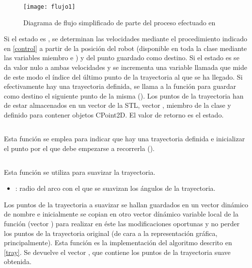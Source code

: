 \begin{figure}[h]
  \centering\texttt{[image: flujo1]}\\
  \caption{Diagrama de flujo simplificado de parte del proceso efectuado en }\label{fg:flujo1}
\end{figure}
Si el estado es , se determinan las velocidades mediante el procedimiento indicado en \ref{control} a partir de la posición del robot (disponible en toda la clase mediante las variables miembro  e ) y del punto guardado como destino.
Si el estado es  se da valor nulo a ambas velocidades y se incrementa una variable llamada  que mide de este modo el índice del último punto de la trayectoria al que se ha llegado. Si efectivamente hay una trayectoria definida, se llama a la función  para guardar como destino el siguiente punto de la misma (). Los puntos de la trayectoria han de estar almacenados en un vector de la STL, vector , miembro de la clase y definido para contener objetos CPoint2D.
\noindent
El valor de retorno es el estado.

\subsection{}

\noindent
{}

\noindent
Esta función se emplea para indicar que hay una trayectoria definida e inicializar el punto por el que debe empezarse a recorrerla ().

\subsection{}

\noindent
{}

\noindent
Esta función se utiliza para suavizar la trayectoria.
\begin{itemize}
  \item {}: radio del arco con el que se suavizan los ángulos de la trayectoria.
\end{itemize}

\noindent
Los puntos de la trayectoria a suavizar se hallan guardados en un vector dinámico de nombre  e inicialmente se copian en otro vector dínámico variable local de la función (vector ) para realizar en éste las modificaciones oportunas y no perder los puntos de la trayectoria original (de cara a la representación gráfica, principalmente).
Esta función es la implementación del algoritmo descrito en \ref{tray}. Se devuelve el vector , que contiene los puntos de la trayectoria suave obtenida.

